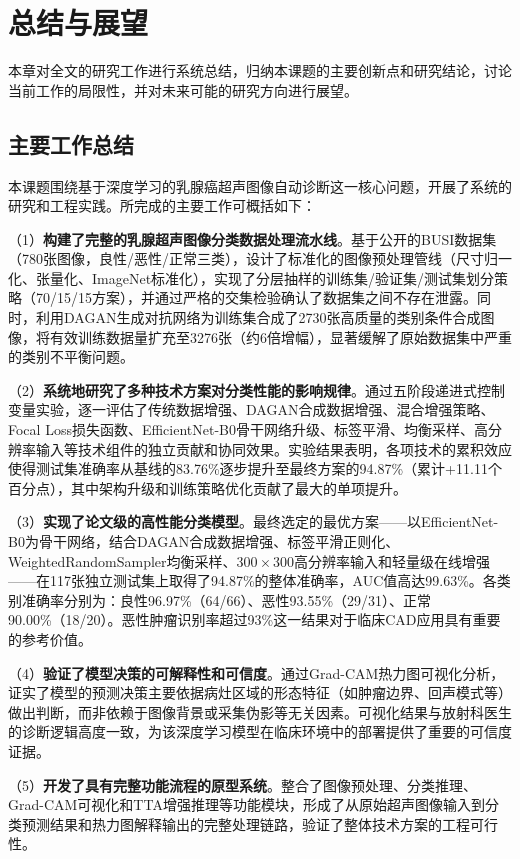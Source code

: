 \section{总结与展望}

本章对全文的研究工作进行系统总结，归纳本课题的主要创新点和研究结论，讨论当前工作的局限性，并对未来可能的研究方向进行展望。


\subsection{主要工作总结}

本课题围绕基于深度学习的乳腺癌超声图像自动诊断这一核心问题，开展了系统的研究和工程实践。所完成的主要工作可概括如下：

（1）\textbf{构建了完整的乳腺超声图像分类数据处理流水线}。基于公开的BUSI数据集（780张图像，良性/恶性/正常三类），设计了标准化的图像预处理管线（尺寸归一化、张量化、ImageNet标准化），实现了分层抽样的训练集/验证集/测试集划分策略（70/15/15方案），并通过严格的交集检验确认了数据集之间不存在泄露。同时，利用DAGAN生成对抗网络为训练集合成了2730张高质量的类别条件合成图像，将有效训练数据量扩充至3276张（约6倍增幅），显著缓解了原始数据集中严重的类别不平衡问题。

（2）\textbf{系统地研究了多种技术方案对分类性能的影响规律}。通过五阶段递进式控制变量实验，逐一评估了传统数据增强、DAGAN合成数据增强、混合增强策略、Focal Loss损失函数、EfficientNet-B0骨干网络升级、标签平滑、均衡采样、高分辨率输入等技术组件的独立贡献和协同效果。实验结果表明，各项技术的累积效应使得测试集准确率从基线的83.76\%逐步提升至最终方案的94.87\%（累计+11.11个百分点），其中架构升级和训练策略优化贡献了最大的单项提升。

（3）\textbf{实现了论文级的高性能分类模型}。最终选定的最优方案——以EfficientNet-B0为骨干网络，结合DAGAN合成数据增强、标签平滑正则化、WeightedRandomSampler均衡采样、$300\times300$高分辨率输入和轻量级在线增强——在117张独立测试集上取得了94.87\%的整体准确率，AUC值高达99.63\%。各类别准确率分别为：良性96.97\%（64/66）、恶性93.55\%（29/31）、正常90.00\%（18/20）。恶性肿瘤识别率超过93\%这一结果对于临床CAD应用具有重要的参考价值。

（4）\textbf{验证了模型决策的可解释性和可信度}。通过Grad-CAM热力图可视化分析，证实了模型的预测决策主要依据病灶区域的形态特征（如肿瘤边界、回声模式等）做出判断，而非依赖于图像背景或采集伪影等无关因素。可视化结果与放射科医生的诊断逻辑高度一致，为该深度学习模型在临床环境中的部署提供了重要的可信度证据。

（5）\textbf{开发了具有完整功能流程的原型系统}。整合了图像预处理、分类推理、Grad-CAM可视化和TTA增强推理等功能模块，形成了从原始超声图像输入到分类预测结果和热力图解释输出的完整处理链路，验证了整体技术方案的工程可行性。


